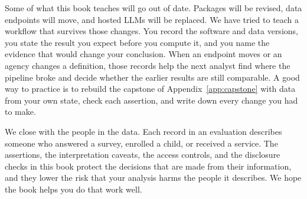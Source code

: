 Some of what this book teaches will go out of date. Packages will be revised, data endpoints will move, and hosted LLMs will be replaced. We have tried to teach a workflow that survives those changes. You record the software and data versions, you state the result you expect before you compute it, and you name the evidence that would change your conclusion. When an endpoint moves or an agency changes a definition, those records help the next analyst find where the pipeline broke and decide whether the earlier results are still comparable. A good way to practice is to rebuild the capstone of Appendix~\ref{app:capstone} with data from your own state, check each assertion, and write down every change you had to make.

We close with the people in the data. Each record in an evaluation describes someone who answered a survey, enrolled a child, or received a service. The assertions, the interpretation caveats, the access controls, and the disclosure checks in this book protect the decisions that are made from their information, and they lower the risk that your analysis harms the people it describes. We hope the book helps you do that work well.

\printbibliography[heading=bibintoc, title=Bibliography]

\printindex


